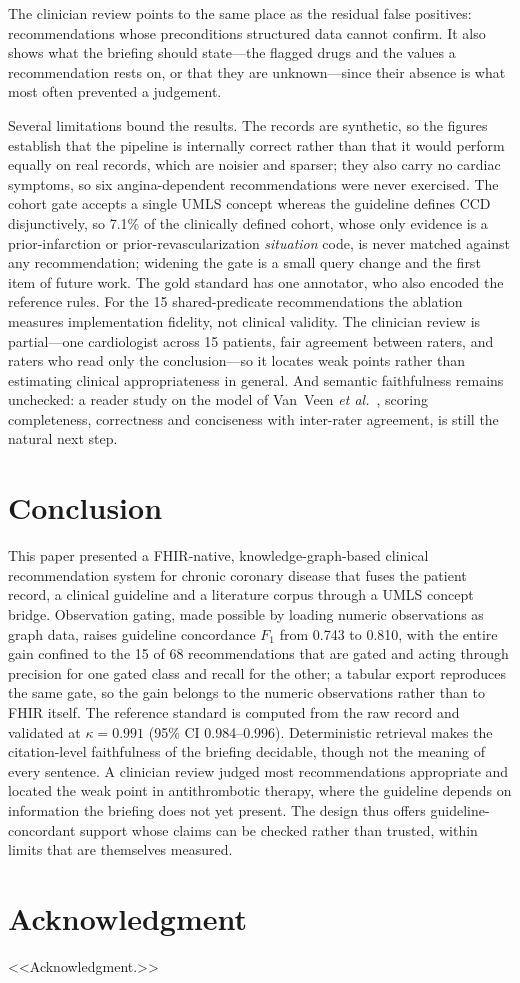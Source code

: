 \documentclass[conference]{IEEEtran}
\begin{document}
The clinician review points to the same place as the residual false positives:
recommendations whose preconditions structured data cannot confirm. It also shows what the
briefing should state---the flagged drugs and the values a recommendation rests on, or
that they are unknown---since their absence is what most often prevented a judgement.

Several limitations bound the results. The records are synthetic, so the figures establish
that the pipeline is internally correct rather than that it would perform equally on real
records, which are noisier and sparser; they also carry no cardiac symptoms, so six
angina-dependent recommendations were never exercised. The cohort gate accepts a single
UMLS concept whereas the guideline defines CCD disjunctively, so 7.1\% of the clinically
defined cohort, whose only evidence is a prior-infarction or prior-revascularization
\emph{situation} code, is never matched against any recommendation; widening the gate is a
small query change and the first item of future work. The gold standard has one annotator,
who also encoded the reference rules. For the 15 shared-predicate recommendations the
ablation measures implementation fidelity, not clinical validity. The clinician review is
partial---one cardiologist across 15 patients, fair agreement between raters, and raters
who read only the conclusion---so it locates weak points rather than estimating clinical
appropriateness in general. And semantic faithfulness remains unchecked: a reader study on
the model of Van~Veen \textit{et al.}~\cite{vanveen2023}, scoring completeness, correctness
and conciseness with inter-rater agreement, is still the natural next step.

\section{Conclusion}

This paper presented a FHIR-native, knowledge-graph-based clinical recommendation system for
chronic coronary disease that fuses the patient record, a clinical guideline and a
literature corpus through a UMLS concept bridge. Observation gating, made possible by
loading numeric observations as graph data, raises guideline concordance $F_1$ from 0.743
to 0.810, with the entire gain confined to the 15 of 68 recommendations that are gated and
acting through precision for one gated class and recall for the other; a tabular export
reproduces the same gate, so the gain belongs to the numeric observations rather than to
FHIR itself. The reference standard is computed from the raw record and validated at
$\kappa = 0.991$ (95\% CI 0.984--0.996). Deterministic retrieval makes the citation-level
faithfulness of the briefing decidable, though not the meaning of every sentence. A
clinician review judged most recommendations appropriate and located the weak point in
antithrombotic therapy, where the guideline depends on information the briefing does not
yet present. The design thus offers guideline-concordant support whose claims can be
checked rather than trusted, within limits that are themselves measured.

\section*{Acknowledgment}

<<Acknowledgment.>>



\end{document}
